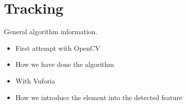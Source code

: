 \chapter{Tracking}
General algorithm information.
\begin{itemize}
\item First attempt with OpenCV
\item How we have done the algorithm
\item With Vuforia
\item How we introduce the element into the detected feature
\end{itemize}
